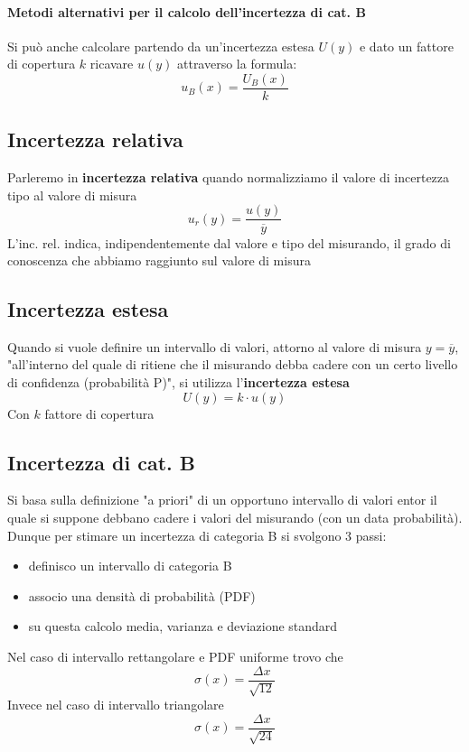 \documentclass{article}
\begin{document}
	\paragraph*{Metodi alternativi per il calcolo dell'incertezza di cat. B}
	Si può anche calcolare partendo da un'incertezza estesa $U(y)$ e dato un fattore di copertura $k$ ricavare $u(y)$ attraverso la formula:
	\begin{equation}
		u_B(x) = \frac{U_B(x)}{k}
	\end{equation}
	\subsection*{Incertezza relativa}
	Parleremo in \textbf{incertezza relativa} quando normalizziamo il valore di incertezza tipo al valore di misura
	\begin{equation}
		u_r(y) = \frac{u(y)}{\overline{y}}
	\end{equation}
	L'inc. rel. indica, indipendentemente dal valore e tipo del misurando, il grado di conoscenza che abbiamo raggiunto sul valore di misura
	\subsection*{Incertezza estesa}
	Quando si vuole definire un intervallo di valori, attorno al valore di misura $y = \overline{y}$, "all'interno del quale di ritiene che il misurando debba cadere con un certo livello di confidenza (probabilità P)", si utilizza l'\textbf{incertezza estesa}
	\begin{equation}
		U(y) = k \cdot u(y)
	\end{equation}
	Con $k$ fattore di copertura
	\subsection*{Incertezza di cat. B}
	Si basa sulla definizione "a priori" di un opportuno intervallo di valori entor il quale si suppone debbano cadere i valori del misurando (con un data probabilità).\\
	Dunque per stimare un incertezza di categoria B si svolgono 3 passi:
	\begin{itemize}
		\item definisco un intervallo di categoria B
		\item associo una densità di probabilità (PDF)
		\item su questa calcolo media, varianza e deviazione standard
	\end{itemize}
	Nel caso di intervallo rettangolare e PDF uniforme trovo che
	\begin{equation}
	\sigma(x) = \frac{\Delta x}{\sqrt{12}}
	\end{equation}
	Invece nel caso di intervallo triangolare
	\begin{equation}
	\sigma(x) = \frac{\Delta x}{\sqrt{24}}
	\end{equation}
\end{document}
